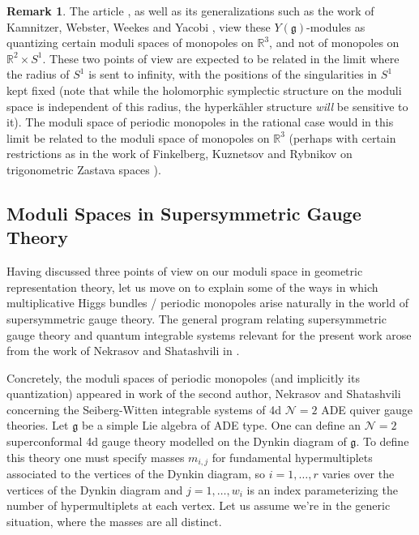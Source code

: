 \documentclass[11pt, oneside, reqno]{amsart}
\theoremstyle{definition} \newtheorem{definition}{Definition}[section]
\theoremstyle{definition} \newtheorem{remark}[definition]{Remark}
\theoremstyle{definition} \newtheorem{remarks}[definition]{Remarks}
\theoremstyle{definition} \newtheorem{question}[definition]{Question}
\theoremstyle{definition} \newtheorem*{note}{Note}
\theoremstyle{definition} \newtheorem{example}[definition]{Example}
\theoremstyle{definition} \newtheorem{examples}[definition]{Examples}
\renewcommand{\gg}{\mathfrak{g}}
\newcommand{\mc}[1]{\mathcal{#1}}
\newcommand{\RR}{\mathbb{R}}
\begin{document}
\begin{remark}
The article \cite{GKLO}, as well as its generalizations such as the work of Kamnitzer, Webster, Weekes and Yacobi \cite{KWWY}, view these $Y(\gg)$-modules as quantizing certain moduli spaces of monopoles on $\RR^3$, and not of monopoles on $\RR^2 \times S^1$.  These two points of view are expected to be related in the limit where the radius of $S^1$ is sent to infinity, with the positions of the singularities in $S^1$ kept fixed (note that while the holomorphic symplectic structure on the moduli space is independent of this radius, the hyperk\"ahler structure \emph{will} be sensitive to it).  The moduli space of periodic monopoles in the rational case would in this limit be related to the moduli space of monopoles on $\RR^3$ (perhaps with certain restrictions as in the work of Finkelberg, Kuznetsov and Rybnikov on trigonometric Zastava spaces \cite{FKR}).
\end{remark}

\subsection{Moduli Spaces in Supersymmetric Gauge Theory} \label{intro_gauge_section}
Having discussed three points of view on our moduli space in geometric representation theory, let us move on to explain some of the ways in which multiplicative Higgs bundles / periodic monopoles arise naturally in the world of supersymmetric gauge theory.  The general program relating supersymmetric gauge theory and quantum integrable systems relevant for the present work arose from the work of Nekrasov and Shatashvili in \cite{Nekrasov:2009ui,Nekrasov:2009rc}.

Concretely, the moduli spaces of periodic monopoles (and implicitly its quantization) appeared in work of the second author, Nekrasov and Shatashvili \cite{NekrasovPestun, NekrasovPestunShatashvili} concerning the Seiberg-Witten integrable systems of 4d $\mc N=2$ ADE quiver gauge theories.  Let $\gg$ be a simple Lie algebra of ADE type.  One can define an $\mc N=2$ superconformal 4d gauge theory modelled on the Dynkin diagram of $\gg$.  To define this theory one must specify masses $m_{i,j}$ for fundamental hypermultiplets associated to the vertices of the Dynkin diagram, so $i = 1,\ldots,r$ varies over the vertices of the Dynkin diagram and $j=1, \ldots,w_i$ is an index parameterizing the number of hypermultiplets at each vertex.  Let us assume we're in the generic situation, where the masses are all distinct.
\end{document}
